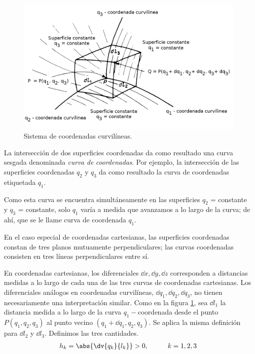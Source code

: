 \begin{figure}[H]
    \centering
    \includegraphics[scale=0.35]{Imagenes/CoordenadasCurvilineas_01.png}
    \caption{Sistema de coordenadas curvilíneas.}
    \label{fig:figura_A_01}
\end{figure}
La intersección de dos superficies coordenadas da como resultado una curva sesgada denominada \emph{curva de coordenadas}. Por ejemplo, la intersección de las superficies coordenadas $q_{2}$ y $q_{3}$ da como resultado la curva de coordenadas etiquetada $q_{1}$.
\par
Como esta curva se encuentra simultáneamente en las superficies $q_{2}$ = constante y $q_{3}$ = constante, solo $q_{1}$ varía a medida que avanzamos a lo largo de la curva; de ahí, que se le llame curva de coordenada $q_{1}$.
\par
En el caso especial de coordenadas cartesianas, las superficies coordenadas constan de tres planos mutuamente perpendiculares; las curvas coordenadas consisten en tres líneas perpendiculares entre sí.
\par
En coordenadas cartesianas, los diferenciales $\dd{x}, \dd{y}, \dd{z}$ corresponden a distancias medidas a lo largo de cada una de las tres curvas de coordenadas cartesianas. Los diferenciales análogos en coordenadas curvilíneas, $\dd{q_{1}}, \dd{q_{2}}, \dd{q_{3}}$, no tienen necesariamente una interpretación similar. Como en la figura \ref{fig:figura_A_01}, sea $\dd{l_{1}}$ la distancia medida a lo largo de la curva $q_{1}-$coordenada desde el punto $P (q_{1}, q_{2}, q_{3})$ al punto vecino $(q_{1} + \dd{q_{1}}, q_{2}, q_{3})$. Se aplica la misma definición para $\dd{l_{2}}$ y $\dd{l_{3}}$. Definimos las tres cantidades.
\begin{align}
h_{k} =  \abs{\dv{q_{k}}{l_{k}}} > 0, \hspace{1cm} k = 1, 2, 3
\label{eq:ecuacion_A_01_04}    
\end{align}

